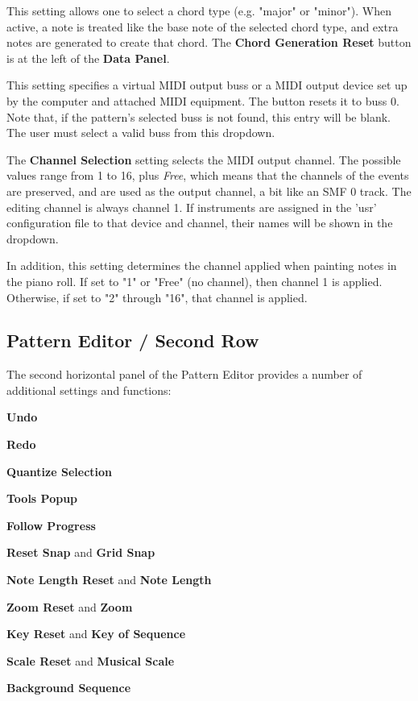    This setting allows one to select a chord type (e.g. "major" or "minor").
   When active, a note is treated like the base note of the selected chord
   type, and extra notes are generated to create that chord.
   The \textbf{Chord Generation Reset} button is at the left of the
   \textbf{Data Panel}.

   This setting specifies a virtual MIDI output buss or a
   MIDI output device set up by the computer and
   attached MIDI equipment.
   The button resets it to buss 0.
   Note that, if the pattern's selected buss is not found, this entry will be
   blank.  The user must select a valid buss from this dropdown.

   The \textbf{Channel Selection} setting selects the MIDI output channel.
   The possible values range from 1 to 16, plus \textsl{Free}, which means
   that the channels of the events are preserved, and are used as the output
   channel, a bit like an SMF 0 track.
   The editing channel is always channel 1.
   If instruments are assigned in the 'usr' configuration file
   to that device and channel, their names will be shown in the dropdown.

   In addition, this setting determines the channel applied when painting notes
   in the piano roll.  If set to "1" or "Free" (no channel), then channel 1 is
   applied.  Otherwise, if set to "2" through "16", that channel is applied.

\subsection{Pattern Editor / Second Row}
\label{subsec:pattern_editor_second_row}

   The second horizontal panel of the Pattern Editor provides a number
   of additional settings and functions:

   \begin{enumber}
      \item \textbf{Undo}
      \item \textbf{Redo}
      \item \textbf{Quantize Selection}
      \item \textbf{Tools Popup}
      \item \textbf{Follow Progress}
      \item \textbf{Reset Snap} and \textbf{Grid Snap}
      \item \textbf{Note Length Reset} and \textbf{Note Length}
      \item \textbf{Zoom Reset} and \textbf{Zoom}
      \item \textbf{Key Reset} and \textbf{Key of Sequence}
      \item \textbf{Scale Reset} and \textbf{Musical Scale}
      \item \textbf{Background Sequence}
   \end{enumber}

